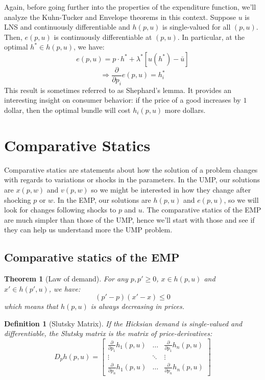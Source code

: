 \documentclass[12pt]{report}
\newtheorem{theorem}{Theorem}[chapter]
\newtheorem{definition}{Definition}[chapter]
\begin{document}
Again, before going further into the properties of the expenditure function, we'll analyze the Kuhn-Tucker and Envelope theorems in this context. Suppose $u$ is LNS and continuously differentiable and $h(p,u)$ is single-valued for all $(p,u)$. Then, $e(p,u)$ is continuously differentiable at $(p,u)$. In particular, at the optimal $h^*\in h(p,u)$, we have: $$e(p,u) = p\cdot h^* + \lambda^*[u(h^*) -\bar u] $$ $$\Rightarrow \frac{\partial}{\partial p_i}e(p,u) = h_i^* $$ This result is sometimes referred to as Shephard's lemma. It provides an interesting insight on consumer behavior: if the price of a good increases by $1$ dollar, then the optimal bundle will cost $h_i(p,u)$ more dollars.

\section{Comparative Statics}

Comparative statics are statements about how the solution of a problem changes with regards to variations or shocks in the parameters. In the UMP, our solutions are $x(p,w)$ and $v(p,w)$ so we might be interested in how they change after shocking $p$ or $w$. In the EMP, our solutions are $h(p,u)$ and $e(p,u)$, so we will look for changes following shocks to $p$ and $u$. The comparative statics of the EMP are much simpler than those of the UMP, hence we'll start with those and see if they can help us understand more the UMP problem.

\subsection{Comparative statics of the EMP}

\begin{theorem}[Law of demand]
For any $p,p' \geq 0$, $x\in h(p,u)$ and $x'\in h(p',u)$, we have: $$(p' - p)(x' - x)\leq 0$$ which means that $h(p,u)$ is always decreasing in prices.
\end{theorem}

\begin{definition}[Slutsky Matrix]
If the Hicksian demand is single-valued and differentiable, the Slutsky matrix is the matrix of price-derivatives: \begin{equation*}
D_p h(p,u) = \begin{bmatrix}
\frac{\partial}{\partial p_1}h_1(p,u) & \hdots &  \frac{\partial}{\partial p_1}h_n(p,u) \\
\vdots & \ddots & \vdots \\
\frac{\partial}{\partial p_n}h_1(p,u) & \hdots &  \frac{\partial}{\partial p_n}h_n(p,u)
\end{bmatrix}
\end{equation*}
\end{definition}
\end{document}
